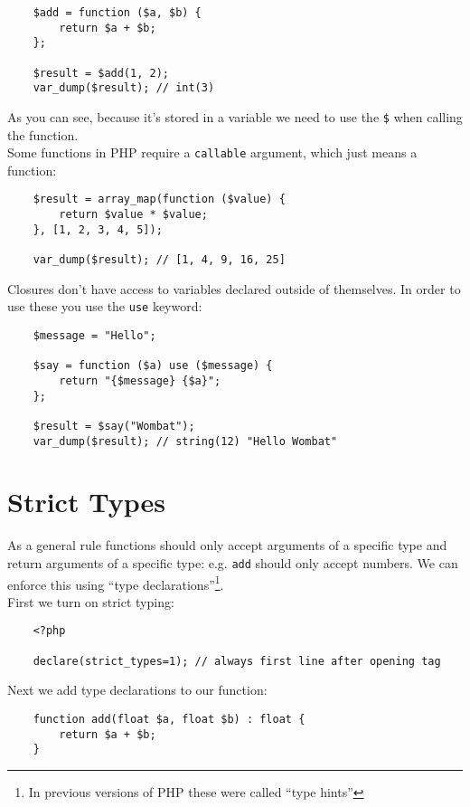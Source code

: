 \begin{verbatim}
    $add = function ($a, $b) {
        return $a + $b;
    };

    $result = $add(1, 2);
    var_dump($result); // int(3)
\end{verbatim}

As you can see, because it's stored in a variable we need to use the \texttt{\$} when calling the function.
\\

Some functions in PHP require a \texttt{callable} argument, which just means a function:

\begin{verbatim}
    $result = array_map(function ($value) {
        return $value * $value;
    }, [1, 2, 3, 4, 5]);

    var_dump($result); // [1, 4, 9, 16, 25]
\end{verbatim}

Closures don't have access to variables declared outside of themselves. In order to use these you use the \texttt{use} keyword:

\begin{verbatim}
    $message = "Hello";

    $say = function ($a) use ($message) {
        return "{$message} {$a}";
    };

    $result = $say("Wombat");
    var_dump($result); // string(12) "Hello Wombat"
\end{verbatim}


\section{Strict Types}

As a general rule functions should only accept arguments of a specific type and return arguments of a specific type: e.g. \texttt{add} should only accept numbers. We can enforce this using ``type declarations''\footnote{In previous versions of PHP these were called ``type hints''}.
\\

First we turn on strict typing:

\begin{verbatim}
    <?php

    declare(strict_types=1); // always first line after opening tag
\end{verbatim}

Next we add type declarations to our function:

\begin{verbatim}
    function add(float $a, float $b) : float {
        return $a + $b;
    }
\end{verbatim}

